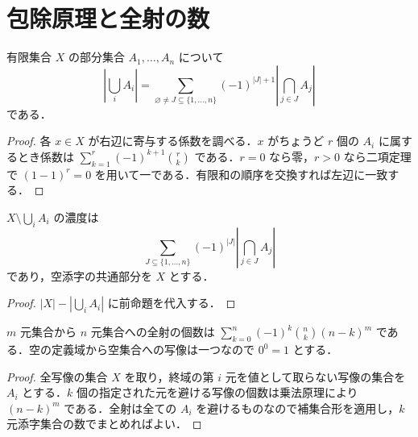 \section{包除原理と全射の数}
\begin{prop}[包除原理]
有限集合 $X$ の部分集合 $A_1,\ldots,A_n$ について
\[
|\bigcup_i A_i|=\sum_{\varnothing\ne J\subseteq\{1,\ldots,n\}}(-1)^{|J|+1}|\bigcap_{j\in J}A_j|
\]
である．
\end{prop}
\begin{proof}
各 $x\in X$ が右辺に寄与する係数を調べる．$x$ がちょうど $r$ 個の $A_i$ に属するとき係数は $\sum_{k=1}^r(-1)^{k+1}\binom rk$ である．$r=0$ なら零，$r>0$ なら二項定理で $(1-1)^r=0$ を用いて一である．有限和の順序を交換すれば左辺に一致する．
\end{proof}
\begin{prop}[補集合形の包除原理]
$X\setminus\bigcup_i A_i$ の濃度は
\[
\sum_{J\subseteq\{1,\ldots,n\}}(-1)^{|J|}|\bigcap_{j\in J}A_j|
\]
であり，空添字の共通部分を $X$ とする．
\end{prop}
\begin{proof}
$|X|-|\bigcup_i A_i|$ に前命題を代入する．
\end{proof}
\begin{prop}[全射の数え上げ]
$m$ 元集合から $n$ 元集合への全射の個数は $\sum_{k=0}^n(-1)^k\binom nk(n-k)^m$ である．空の定義域から空集合への写像は一つなので $0^0=1$ とする．
\end{prop}
\begin{proof}
全写像の集合 $X$ を取り，終域の第 $i$ 元を値として取らない写像の集合を $A_i$ とする．$k$ 個の指定された元を避ける写像の個数は乗法原理により $(n-k)^m$ である．全射は全ての $A_i$ を避けるものなので補集合形を適用し，$k$ 元添字集合の数でまとめればよい．
\end{proof}
